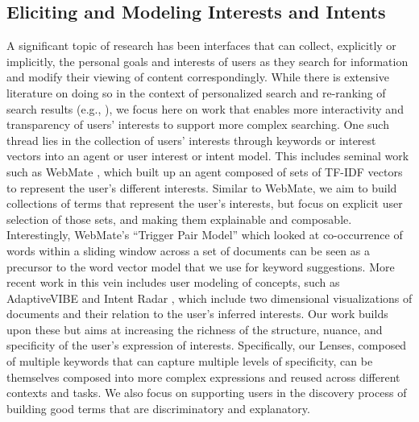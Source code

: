 \documentclass{sigchi}
\begin{document}
\subsection{Eliciting and Modeling Interests and Intents}

A significant topic of research has been interfaces that can collect, explicitly or implicitly, the personal goals and interests of users as they search for information and modify their viewing of content correspondingly. While there is extensive literature on doing so in the context of personalized search and re-ranking of search results (e.g., \cite{speretta2005personalized,shen2005implicit,burges2005learning,cao2007learning}), we focus here on work that enables more interactivity and transparency of users' interests to support more complex searching.  One such thread lies in the collection of users' interests through keywords or interest vectors into an agent or user interest or intent model. This includes seminal work such as WebMate \cite{chen1998webmate}, which built up an agent composed of sets of TF-IDF \cite{wu2008interpreting} vectors to represent the user's different interests. Similar to WebMate, we aim to build collections of terms that represent the user's interests, but focus on explicit user selection of those sets, and making them explainable and composable. Interestingly, WebMate's ``Trigger Pair Model'' which looked at co-occurrence of words within a sliding window across a set of documents can be seen as a precursor to the word vector model that we use for keyword suggestions.  More recent work in this vein includes user modeling of concepts, such as AdaptiveVIBE \cite{ahn2009adaptive} and Intent Radar \cite{peltonen2017negative}, which include two dimensional visualizations of documents and their relation to the user's inferred interests. Our work builds upon these but aims at increasing the richness of the structure, nuance, and specificity of the user's expression of interests. Specifically, our Lenses, composed of multiple keywords that can capture multiple levels of specificity, can be themselves composed into more complex expressions and reused across different contexts and tasks. We also focus on supporting users in the discovery process of building good terms that are discriminatory and explanatory.


\end{document}
